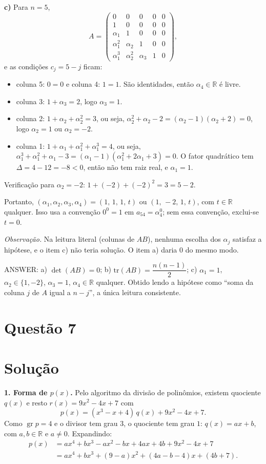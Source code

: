 \documentclass{article}%
\begin{document}
\textbf{c)} Para $n=5$,
\[
A=\begin{pmatrix}
0&0&0&0&0\\
1&0&0&0&0\\
\alpha_1&1&0&0&0\\
\alpha_1^2&\alpha_2&1&0&0\\
\alpha_1^3&\alpha_2^2&\alpha_3&1&0
\end{pmatrix},
\]
e as condições $c_j=5-j$ ficam:
\begin{itemize}
\item coluna 5: $0=0$ e coluna 4: $1=1$. São identidades, então $\alpha_4\in\mathbb{R}$ é livre.
\item coluna 3: $1+\alpha_3=2$, logo $\alpha_3=1$.
\item coluna 2: $1+\alpha_2+\alpha_2^2=3$, ou seja, $\alpha_2^2+\alpha_2-2=(\alpha_2-1)(\alpha_2+2)=0$, logo $\alpha_2=1$ ou $\alpha_2=-2$.
\item coluna 1: $1+\alpha_1+\alpha_1^2+\alpha_1^3=4$, ou seja, $\alpha_1^3+\alpha_1^2+\alpha_1-3=(\alpha_1-1)(\alpha_1^2+2\alpha_1+3)=0$. O fator quadrático tem $\Delta=4-12=-8<0$, então não tem raiz real, e $\alpha_1=1$.
\end{itemize}
Verificação para $\alpha_2=-2$: $1+(-2)+(-2)^2=3=5-2$.

Portanto, $(\alpha_1,\alpha_2,\alpha_3,\alpha_4)=(1,\,1,\,1,\,t)$ ou $(1,\,-2,\,1,\,t)$, com $t\in\mathbb{R}$ qualquer. Isso usa a convenção $0^0=1$ em $a_{54}=\alpha_4^0$; sem essa convenção, exclui-se $t=0$.

\emph{Observação.} Na leitura literal (colunas de $AB$), nenhuma escolha dos $\alpha_j$ satisfaz a hipótese, e o item c) não teria solução. O item a) daria $0$ do mesmo modo.

\medskip
ANSWER: a) $\det(AB)=0$; b) $\mathrm{tr}(AB)=\dfrac{n(n-1)}{2}$; c) $\alpha_1=1$, $\alpha_2\in\{1,-2\}$, $\alpha_3=1$, $\alpha_4\in\mathbb{R}$ qualquer. Obtido lendo a hipótese como ``soma da coluna $j$ de $A$ igual a $n-j$'', a única leitura consistente.%
\newpage%
\section*{Questão 7}

\section*{Solução}

\textbf{1. Forma de $p(x)$.} Pelo algoritmo da divisão de polinômios, existem quociente $q(x)$ e resto $r(x)=9x^2-4x+7$ com
\[
p(x)=(x^3-x+4)\,q(x)+9x^2-4x+7 .
\]
Como $\operatorname{gr} p=4$ e o divisor tem grau $3$, o quociente tem grau $1$: $q(x)=ax+b$, com $a,b\in\mathbb{R}$ e $a\neq 0$. Expandindo:
\begin{align*}
p(x)&=ax^4+bx^3-ax^2-bx+4ax+4b+9x^2-4x+7\\
&=ax^4+bx^3+(9-a)x^2+(4a-b-4)x+(4b+7).
\end{align*}
\end{document}
